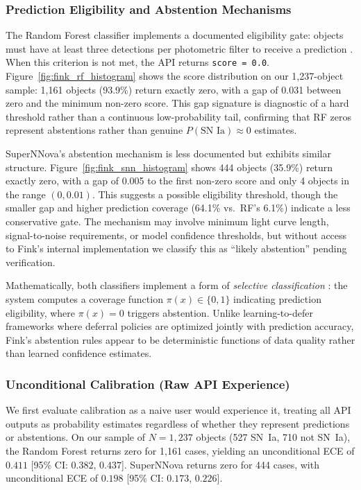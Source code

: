 \documentclass[twocolumn]{aastex631}
\begin{document}
\subsubsection{Prediction Eligibility and Abstention Mechanisms}

The Random Forest classifier implements a documented eligibility gate: objects must have at least three detections per photometric filter to receive a prediction \citep{leoni2022}. When this criterion is not met, the API returns \texttt{score = 0.0}. Figure~\ref{fig:fink_rf_histogram} shows the score distribution on our 1,237-object sample: 1,161 objects (93.9\%) return exactly zero, with a gap of 0.031 between zero and the minimum non-zero score. This gap signature is diagnostic of a hard threshold rather than a continuous low-probability tail, confirming that RF zeros represent abstentions rather than genuine $P(\text{SN~Ia}) \approx 0$ estimates.

SuperNNova's abstention mechanism is less documented but exhibits similar structure. Figure~\ref{fig:fink_snn_histogram} shows 444 objects (35.9\%) return exactly zero, with a gap of 0.005 to the first non-zero score and only 4 objects in the range $(0, 0.01)$. This suggests a possible eligibility threshold, though the smaller gap and higher prediction coverage (64.1\% vs.\ RF's 6.1\%) indicate a less conservative gate. The mechanism may involve minimum light curve length, signal-to-noise requirements, or model confidence thresholds, but without access to Fink's internal implementation we classify this as ``likely abstention'' pending verification.

Mathematically, both classifiers implement a form of \emph{selective classification} \citep{geifman2017}: the system computes a coverage function $\pi(x) \in \{0, 1\}$ indicating prediction eligibility, where $\pi(x) = 0$ triggers abstention. Unlike learning-to-defer frameworks \citep{mozannar2020,madras2018} where deferral policies are optimized jointly with prediction accuracy, Fink's abstention rules appear to be deterministic functions of data quality rather than learned confidence estimates.

\subsubsection{Unconditional Calibration (Raw API Experience)}

We first evaluate calibration as a naive user would experience it, treating all API outputs as probability estimates regardless of whether they represent predictions or abstentions. On our sample of $N = 1{,}237$ objects (527 SN~Ia, 710 not SN~Ia), the Random Forest returns zero for 1,161 cases, yielding an unconditional ECE of $0.411$ [95\% CI: $0.382$, $0.437$]. SuperNNova returns zero for 444 cases, with unconditional ECE of $0.198$ [95\% CI: $0.173$, $0.226$].
\end{document}
